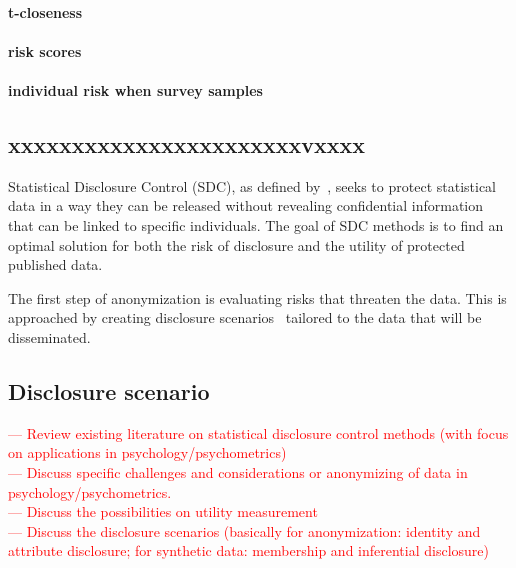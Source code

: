 \documentclass{article}
\begin{document}
\paragraph{t-closeness}

\paragraph{risk scores}

\paragraph{individual risk when survey samples}



\subsection{xxxxxxxxxxxxxxxxxxxxxxxvxxxx}

Statistical Disclosure Control (SDC), as defined by~\cite{2012_Hundepool}, seeks to protect statistical data in a way they can be released without revealing confidential information that can be linked to specific individuals. The goal of SDC methods is to find an optimal solution for both the risk of disclosure and the utility of protected published data.


\newline
















The first step of anonymization is evaluating risks that threaten the data. This is approached by creating disclosure scenarios~\cite{2012_Hundepool} tailored to the data that will be disseminated. 


\subsection{Disclosure scenario}

\textcolor{red}{— Review existing literature on statistical disclosure control methods (with focus on applications in  psychology/psychometrics)} \\
\textcolor{red}{— Discuss specific challenges and considerations or anonymizing of data in psychology/psychometrics.} \\
\textcolor{red}{— Discuss the possibilities on utility measurement} \\
\textcolor{red}{— Discuss the disclosure scenarios (basically for anonymization: identity and attribute disclosure; for synthetic data: membership and inferential disclosure)} \\
\end{document}
